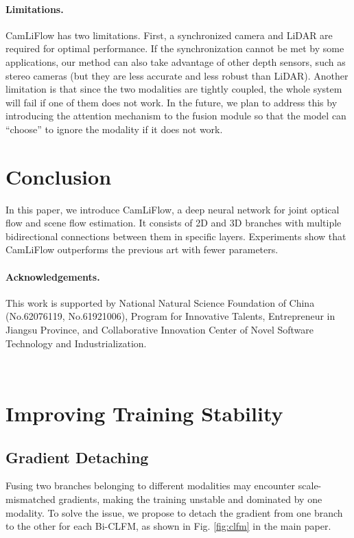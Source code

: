 \documentclass[10pt,twocolumn,letterpaper]{article}
\begin{document}
\paragraph{Limitations.} CamLiFlow has two limitations. First, a synchronized camera and LiDAR are required for optimal performance. If the synchronization cannot be met by some applications, our method can also take advantage of other depth sensors, such as stereo cameras (but they are less accurate and less robust than LiDAR).
Another limitation is that since the two modalities are tightly coupled, the whole system will fail if one of them does not work. In the future, we plan to address this by introducing the attention mechanism to the fusion module so that the model can ``choose'' to ignore the modality if it does not work.

\section{Conclusion}

In this paper, we introduce CamLiFlow, a deep neural network for joint optical flow and scene flow estimation. It consists of 2D and 3D branches with multiple bidirectional connections between them in specific layers. Experiments show that CamLiFlow outperforms the previous art with fewer parameters.

\vspace{-10pt}
\paragraph{Acknowledgements.} This work is supported by National Natural Science Foundation of China (No.62076119, No.61921006), Program for Innovative Talents, Entrepreneur in Jiangsu Province, and Collaborative Innovation Center of Novel Software Technology and Industrialization.

{\small


}

\newpage
~
\newpage

\appendix
\section{Improving Training Stability}

\subsection{Gradient Detaching} Fusing two branches belonging to different modalities may encounter scale-mismatched gradients, making the training unstable and dominated by one modality. To solve the issue, we propose to detach the gradient from one branch to the other for each Bi-CLFM, as shown in Fig. \ref{fig:clfm} in the main paper.
\end{document}
